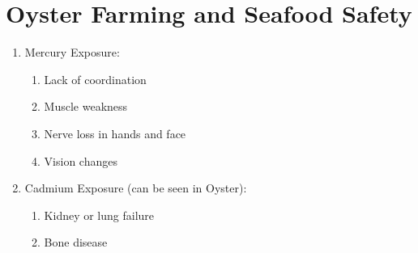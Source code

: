 \documentclass{report}
\begin{document}
\section{Oyster Farming and Seafood Safety}
\begin{enumerate}
    \item Mercury Exposure:
    \begin{enumerate}
        \item Lack of coordination
        \item Muscle weakness
        \item Nerve loss in hands and face
        \item Vision changes
    \end{enumerate}
    \item Cadmium Exposure (can be seen in Oyster):
    \begin{enumerate}
        \item Kidney or lung failure
        \item Bone disease
    \end{enumerate}
\end{enumerate}
\end{document}
